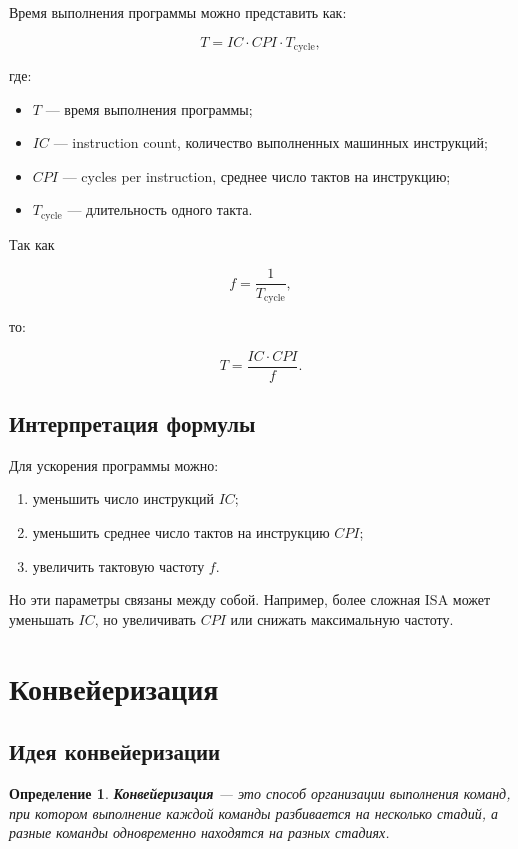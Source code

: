 \documentclass[12pt,a4paper]{article}
\newtheorem{definition}{Определение}
\begin{document}
Время выполнения программы можно представить как:

\[
    T = IC \cdot CPI \cdot T_{\text{cycle}},
\]

где:

\begin{itemize}
    \item $T$ --- время выполнения программы;
    \item $IC$ --- instruction count, количество выполненных машинных инструкций;
    \item $CPI$ --- cycles per instruction, среднее число тактов на инструкцию;
    \item $T_{\text{cycle}}$ --- длительность одного такта.
\end{itemize}

Так как

\[
    f = \frac{1}{T_{\text{cycle}}},
\]

то:

\[
    T = \frac{IC \cdot CPI}{f}.
\]

\subsection{Интерпретация формулы}

Для ускорения программы можно:

\begin{enumerate}
    \item уменьшить число инструкций $IC$;
    \item уменьшить среднее число тактов на инструкцию $CPI$;
    \item увеличить тактовую частоту $f$.
\end{enumerate}

Но эти параметры связаны между собой. Например, более сложная ISA может уменьшать $IC$, но увеличивать $CPI$ или снижать максимальную частоту.

\section{Конвейеризация}

\subsection{Идея конвейеризации}

\begin{definition}
\textbf{Конвейеризация} --- это способ организации выполнения команд, при котором выполнение каждой команды разбивается на несколько стадий, а разные команды одновременно находятся на разных стадиях.
\end{definition}
\end{document}
